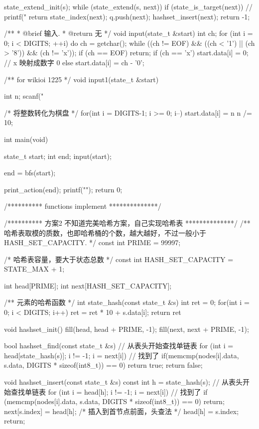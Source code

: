 \begin{Codex}[label=eight_digits_bfs2.c]
{{        state_extend_init(s);
        while (state_extend(s, next)) {
            if (state_is_target(next)) {
                // printf("%
                return state_index(next);
            }
            q.push(next);
            hashset_insert(next);
        }
    }
    return -1;
}

/**
 * @brief 输入.
 * @return 无
 */
void input(state_t &start) {
    int ch;
    for (int i = 0; i < DIGITS; ++i) {
        do {
            ch = getchar();
        } while ((ch != EOF) && ((ch < '1') || (ch > '8')) && (ch != 'x'));
        if (ch == EOF) return;
        if (ch == 'x') start.data[i] = 0; // x 映射成数字 0
        else           start.data[i] = ch - '0';
    }
}

/** for wikioi 1225 */
void input1(state_t &start) {
    int n;
    scanf("%

    /* 将整数转化为棋盘 */
    for(int i = DIGITS-1; i >= 0; i--) {
        start.data[i] = n %
        n /= 10;
    }
}

int main(void) {
    state_t start;
    int end;
    input(start);

    end = bfs(start);

    print_action(end);
    printf("\n");
    return 0;
}

/********** functions implement **************/

/********** 方案2 不知道完美哈希方案，自己实现哈希表 **************/
/** 哈希表取模的质数，也即哈希桶的个数，越大越好，不过一般小于 HASH_SET_CAPACITY. */
const int PRIME = 99997;

/* 哈希表容量，要大于状态总数 */
const int HASH_SET_CAPACITY = STATE_MAX + 1;

int head[PRIME];
int next[HASH_SET_CAPACITY];

/** 元素的哈希函数  */
int state_hash(const state_t &s) {
    int ret = 0;
    for(int i = 0; i < DIGITS; i++) ret = ret * 10 + s.data[i];
    return ret %
}

void hashset_init() {
    fill(head, head + PRIME, -1);
    fill(next, next + PRIME, -1);
}

bool hashset_find(const state_t &s) {
    // 从表头开始查找单链表
    for (int i = head[state_hash(s)]; i != -1; i = next[i]) {
        // 找到了
        if(memcmp(nodes[i].data, s.data,
                DIGITS * sizeof(int8_t)) == 0)
            return true;
    }
    return false;
}

void hashset_insert(const state_t &s) {
    const int h = state_hash(s);
    // 从表头开始查找单链表
    for (int i = head[h]; i != -1; i = next[i]) {
        // 找到了
        if (memcmp(nodes[i].data, s.data,
                DIGITS * sizeof(int8_t)) == 0)
            return;
    }
    next[s.index] = head[h]; /* 插入到首节点前面，头查法 */
    head[h] = s.index;
    return;
}


\end{Codex}
